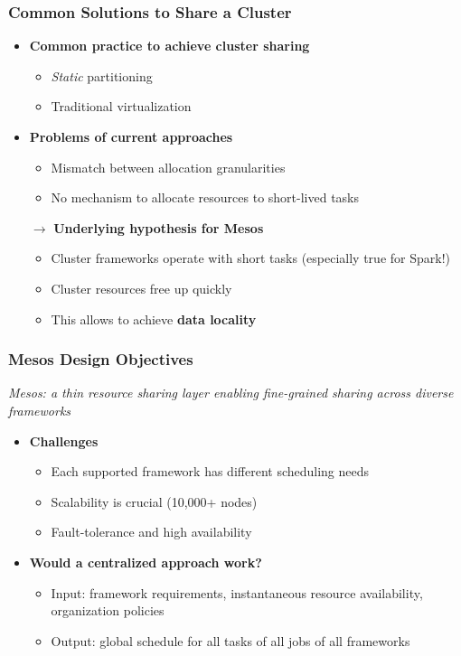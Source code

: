 \begin{frame}
\frametitle{Common Solutions to Share a Cluster}
\begin{itemize}
	\item {\bf Common practice to achieve cluster sharing}
	\begin{itemize}
		\item {\it Static} partitioning
		\item Traditional virtualization
	\end{itemize}

\vspace{20pt}

	\item {\bf Problems of current approaches}
	\begin{itemize}
		\item Mismatch between allocation granularities
		\item No mechanism to allocate resources to short-lived tasks
	\end{itemize}

\vspace{20pt}

	\item[$\to$] {\bf Underlying hypothesis for Mesos}
	\begin{itemize}
		\item Cluster frameworks operate with short tasks (especially true for Spark!)
		\item Cluster resources free up quickly
		\item This allows to achieve {\bf data locality}
	\end{itemize}
\end{itemize}
\end{frame}

\begin{frame}
\frametitle{Mesos Design Objectives}
{\it Mesos: a thin resource sharing layer enabling fine-grained sharing across diverse frameworks}

\vspace{20pt}

\begin{itemize}
	\item {\bf Challenges}
	\begin{itemize}
		\item Each supported framework has different scheduling needs
		\item Scalability is crucial (10,000+ nodes)
		\item Fault-tolerance and high availability
	\end{itemize}

\vspace{20pt}

	\item {\bf Would a centralized approach work?}
	\begin{itemize}
		\item Input: framework requirements, instantaneous resource availability, organization policies
		\item Output: global schedule for all tasks of all jobs of all frameworks
	\end{itemize}
\end{itemize}
\end{frame}


